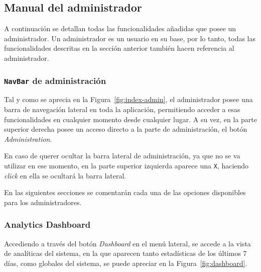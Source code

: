 
\FloatBarrier
\subsection{Manual del administrador}
A continuación se detallan todas las funcionalidades añadidas que posee un administrador. Un administrador es un usuario en su base, por lo tanto, todas las funcionalidades descritas en la sección anterior también hacen referencia al administrador.

\subsubsection{\texttt{NavBar} de administración}
Tal y como se aprecia en la Figura~\ref{fig:index-admin}, el administrador posee una barra de navegación lateral en toda la aplicación, permitiendo acceder a esas funcionalidades en cualquier momento desde cualquier lugar. A su vez, en la parte superior derecha posee un acceso directo a la parte de administración, el botón \textit{Administration}.

En caso de querer ocultar la barra lateral de administración, ya que no se va utilizar en ese momento, en la parte superior izquierda aparece una \texttt{X}, haciendo \textit{click} en ella se ocultará la barra lateral.


En las siguientes secciones se comentarán cada una de las opciones disponibles para los administradores.

\subsubsection{Analytics Dashboard}
Accediendo a través del botón \textit{Dashboard} en el menú lateral, se accede a la vista de analíticas del sistema, en la que aparecen tanto estadísticas de los últimos 7 días, como globales del sistema, se puede apreciar en la Figura~\ref{fig:dashboard}.


